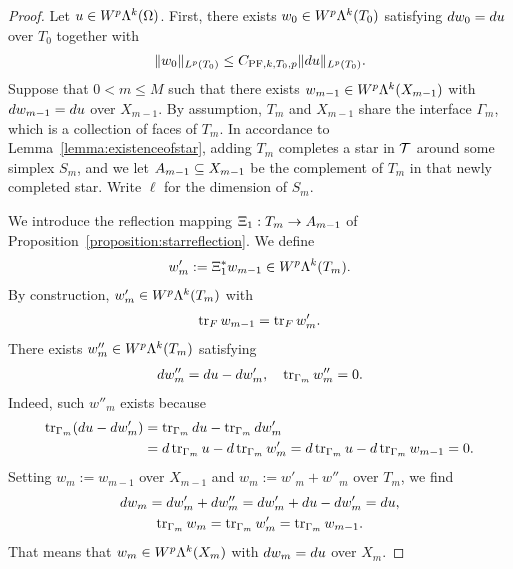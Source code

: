 \documentclass[10pt,a4paper]{article}
\begin{document}
\begin{proof}
    Let $u \in W^{p}\Lambda^{k}(\Omega)$. 
    First, there exists $w_0 \in W^{p}\Lambda^{k}(T_{0})$ satisfying $d w_0 = d u$ over $T_{0}$ together with 
    \begin{gather*}
        \| w_0 \|_{L^{p}(T_{0})} \leq C_{{{\rm PF}},k,T_{0},p} \| d u \|_{L^{p}(T_{0})}.
    \end{gather*}
    Suppose that $0 < m \leq M$ such that there exists $w_{m-1} \in W^{p}\Lambda^{k}(X_{m-1})$ 
    with $d w_{m-1} = d u$ over $X_{m-1}$. 
    By assumption, $T_{m}$ and $X_{m-1}$ share the interface $\Gamma_{m}$, which is a collection of faces of $T_{m}$. 
    In accordance to Lemma~\ref{lemma:existenceofstar}, adding $T_{m}$ completes a star in ${\mathcal T}$ around some simplex $S_{m}$, 
    and we let $A_{m-1} \subseteq X_{m-1}$ be the complement of $T_{m}$ in that newly completed star. 
    Write $\ell$ for the dimension of $S_{m}$.
    
    We introduce the reflection mapping $\Xi_{1} : T_{m} \rightarrow A_{m-1}$ of Proposition~\ref{proposition:starreflection}. 
    We define 
    \begin{align*}
        w'_{m} :=  \Xi_{1}^{\ast} w_{m-1} \in W^{p}\Lambda^{k}(T_{m}).
    \end{align*}
    By construction, $w'_{m} \in W^{p}\Lambda^{k}(T_{m})$ with 
    \begin{align*}
        \operatorname{tr}_F w_{m-1} = \operatorname{tr}_F w'_{m}
        . 
    \end{align*}
    There exists $w''_{m} \in W^{p}\Lambda^{k}(T_{m})$ satisfying 
    \begin{align*}
        d w''_{m} = d u - d w'_{m}, 
        \quad 
        \operatorname{tr}_{\Gamma_{m}} w''_{m} = 0.
    \end{align*}
    Indeed, such $w''_{m}$ exists because 
    \begin{align*}
        \operatorname{tr}_{\Gamma_{m}}( d u - d w'_{m} ) 
        &= 
        \operatorname{tr}_{\Gamma_{m}} d u - \operatorname{tr}_{\Gamma_{m}} d w'_{m}
        \\&= 
        d \operatorname{tr}_{\Gamma_{m}} u - d \operatorname{tr}_{\Gamma_{m}} w'_{m}
        = 
        d \operatorname{tr}_{\Gamma_{m}} u - d \operatorname{tr}_{\Gamma_{m}} w_{m-1}
        = 
        0
        .
    \end{align*}
    Setting $w_{m} := w_{m-1}$ over $X_{m-1}$ and $w_{m} := w'_{m} + w''_{m}$ over $T_{m}$, 
    we find 
    \begin{gather*}
        d w_{m} = d w'_{m} + d w''_{m} = d w'_{m} + d u - d w'_{m} = d u,
        \\
        \operatorname{tr}_{\Gamma_{m}} w_{m} = \operatorname{tr}_{\Gamma_{m}} w'_{m} = \operatorname{tr}_{\Gamma_{m}} w_{m-1}.
    \end{gather*}
    That means that $w_{m} \in W^{p}\Lambda^{k}(X_{m})$ with $d w_{m} = d u$ over $X_{m}$. 
    

\end{proof}
\end{document}

